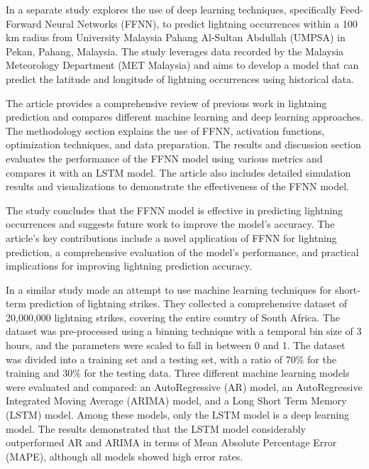 In a separate study \textcite{new1} explores the use of deep learning techniques, specifically Feed-Forward Neural Networks (FFNN), to predict lightning occurrences within a 100 km radius from University Malaysia Pahang Al-Sultan Abdullah (UMPSA) in Pekan, Pahang, Malaysia. The study leverages data recorded by the Malaysia Meteorology Department (MET Malaysia) and aims to develop a model that can predict the latitude and longitude of lightning occurrences using historical data.

The article provides a comprehensive review of previous work in lightning prediction and compares different machine learning and deep learning approaches. The methodology section explains the use of FFNN, activation functions, optimization techniques, and data preparation. The results and discussion section evaluates the performance of the FFNN model using various metrics and compares it with an LSTM model. The article also includes detailed simulation results and visualizations to demonstrate the effectiveness of the FFNN model.

The study concludes that the FFNN model is effective in predicting lightning occurrences and suggests future work to improve the model's accuracy. The article's key contributions include a novel application of FFNN for lightning prediction, a comprehensive evaluation of the model's performance, and practical implications for improving lightning prediction accuracy.

In a similar study \textcite{bib10} made an attempt to use machine learning techniques for short-term prediction of lightning strikes. They collected a comprehensive dataset of 20,000,000 lightning strikes, covering the entire country of South Africa. The dataset was pre-processed using a binning technique with a temporal bin size of 3 hours, and the parameters were scaled to fall in between 0 and 1. The dataset was divided into a training set and a testing set, with a ratio of 70\% for the training and 30\% for the testing data. Three different machine learning models were evaluated and compared: an AutoRegressive (AR) model, an AutoRegressive Integrated Moving Average (ARIMA) model, and a Long Short Term Memory (LSTM) model. Among these models, only the LSTM model is a deep learning model. The results demonstrated that the LSTM model considerably outperformed AR and ARIMA in terms of Mean Absolute Percentage Error (MAPE), although all models showed high error rates.


